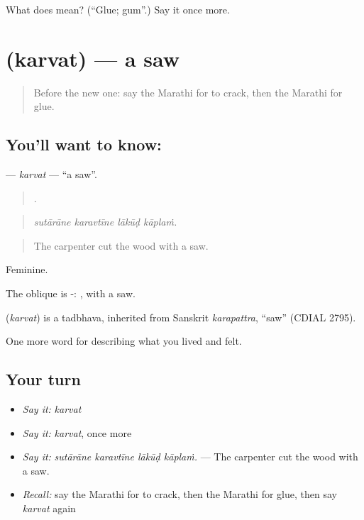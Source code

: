 \begin{tcolorbox}[breakable,colback=teal!4,colframe=teal!35!black,title={Before you move on}]
What does  mean? (\textquotedblleft{}Glue; gum\textquotedblright{}.) Say it once more.
\end{tcolorbox}
\section[\texorpdfstring{\mr{करवत} (karvat)}{करवत (karvat)}]{ (karvat) — a saw}

\label{lesson:MR-C521-karvat}



\begin{quote}
Before the new one: say the Marathi for to crack, then the Marathi for glue.
\end{quote}

\subsection*{You'll want to know: }
\textbf{} — \emph{karvat} — \textquotedblleft{}a saw\textquotedblright{}.

\begin{quote}
   .
\end{quote}

\begin{quote}
\emph{sutārāne karavtīne lākūḍ kāplaṁ.}
\end{quote}

\begin{quote}
The carpenter cut the wood with a saw.
\end{quote}

Feminine.

The oblique is -: , with a saw.

\begin{cousinweb}
\textbf{} (\emph{karvat}) is a tadbhava, inherited from Sanskrit \emph{karapattra}, \textquotedblleft{}saw\textquotedblright{} (CDIAL 2795).
\end{cousinweb}

\begin{grammarlens}[title={What you've built}]
One more word for describing what you lived and felt.
\end{grammarlens}

\subsection*{Your turn}
\begin{itemize}
\raggedright
  \item \emph{Say it:} \emph{karvat}
  \item \emph{Say it:} \emph{karvat}, once more
  \item \emph{Say it:} \emph{sutārāne karavtīne lākūḍ kāplaṁ.} — The carpenter cut the wood with a saw.
  \item \emph{Recall:} say the Marathi for to crack, then the Marathi for glue, then say \emph{karvat} again
\end{itemize}

